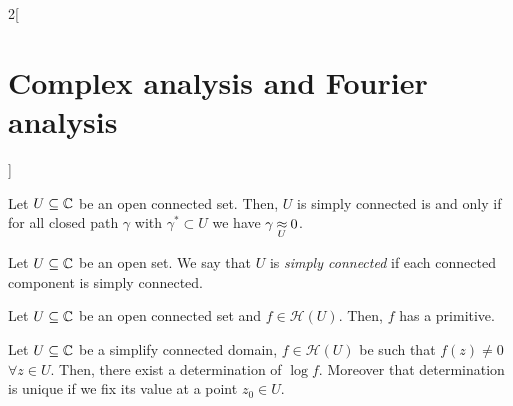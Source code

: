 \documentclass[../../../main.tex]{subfiles}
\begin{document}
\begin{multicols}{2}[\section{Complex analysis and Fourier analysis}]
\begin{proposition}
    Let $U\subseteq\mathbb{C}$ be an open connected set. Then, $U$ is simply connected is and only if for all closed path $\gamma$ with $\gamma^*\subset U$ we have $\gamma\mathbin{\underset{U}{\approx}}0$.
  \end{proposition}
  \begin{definition}
    Let $U\subseteq\mathbb{C}$ be an open set. We say that $U$ is \emph{simply connected} if each connected component is simply connected.
  \end{definition}
  \begin{theorem}
    Let $U\subseteq\mathbb{C}$ be an open connected set and $f\in\mathcal{H}(U)$. Then, $f$ has a primitive.
  \end{theorem}
  \begin{theorem}
    Let $U\subseteq\mathbb{C}$ be a simplify connected domain, $f\in\mathcal{H}(U)$ be such that $f(z)\ne 0$ $\forall z\in U$. Then, there exist a determination of $\log f$. Moreover that determination is unique if we fix its value at a point $z_0\in U$.
  \end{theorem}

\end{multicols}
\end{document}

